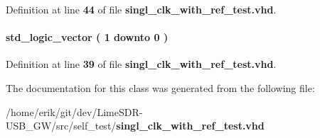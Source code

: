 Definition at line {\bf 44} of file {\bf singl\+\_\+clk\+\_\+with\+\_\+ref\+\_\+test.\+vhd}.

\paragraph[{test\+\_\+en\+\_\+reg}]{ {\bfseries \textcolor{comment}{std\+\_\+logic\+\_\+vector}\textcolor{vhdlchar}{ }\textcolor{vhdlchar}{(}\textcolor{vhdlchar}{ }\textcolor{vhdlchar}{ } \textcolor{vhdldigit}{1} \textcolor{vhdlchar}{ }\textcolor{keywordflow}{downto}\textcolor{vhdlchar}{ }\textcolor{vhdlchar}{ } \textcolor{vhdldigit}{0} \textcolor{vhdlchar}{ }\textcolor{vhdlchar}{)}\textcolor{vhdlchar}{ }} \hspace{0.3cm}{\ttfamily [Signal]}}\label{classsingl__clk__with__ref__test_1_1arch_a46a04c6cb1df7ed695c88bb6f815c26f}


Definition at line {\bf 39} of file {\bf singl\+\_\+clk\+\_\+with\+\_\+ref\+\_\+test.\+vhd}.



The documentation for this class was generated from the following file\+:\begin{DoxyCompactItemize}
\item 
/home/erik/git/dev/\+Lime\+S\+D\+R-\/\+U\+S\+B\+\_\+\+G\+W/src/self\+\_\+test/{\bf singl\+\_\+clk\+\_\+with\+\_\+ref\+\_\+test.\+vhd}\end{DoxyCompactItemize}
